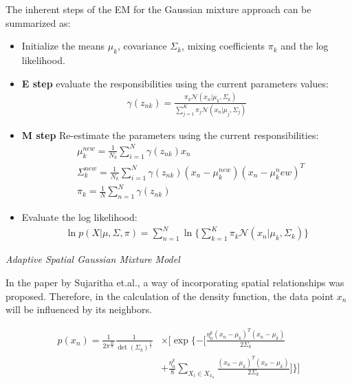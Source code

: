 \documentclass[12pt,letterpaper]{article}
\begin{document}
The inherent steps of the EM for the Gaussian mixture approach can be summarized as:
\begin{itemize}
\item Initialize the means $\mu_k$, covariance $\Sigma_k$, mixing coefficients $\pi_k$ and the log likelihood.
\item \textbf{E step} evaluate the responsibilities using the current parameters values:
\begin{align}
\gamma(z_{nk} )= \frac{\pi_k \mathcal{N}(x_n | \mu_k, \Sigma_k)}{\sum_{j=1}^{K}\pi_j\mathcal{N}(x_n |\mu_j, \Sigma_j)}
\end{align}
\item \textbf{M step} Re-estimate the parameters using the current responsibilities:
\begin{align}
&\mu_k^{new} = \frac{1}{N_k}\sum_{i=1}^N \gamma(z_{nk})x_n \\
&\Sigma_k^{new} =  \frac{1}{N_k}\sum_{i=1}^N \gamma(z_{nk})(x_n - \mu_k^{new})(x_n - \mu_k^new)^T \\
&\pi_k = \frac{1}{N}\sum_{n=1}^{N}\gamma(z_{nk} )
\end{align}
\item Evaluate the log likelihood:
\begin{align}
\ln p(X | \mu,\Sigma,\pi) = \sum_{n=1}^{N}\ln \lbrace\sum_{k=1}^{K}\pi_k \mathcal{N}(x_n|\mu_k, \Sigma_k)\rbrace
\end{align}
\end{itemize}

\textit{Adaptive Spatial Gaussian Mixture Model}

In the paper by Sujaritha et.al., a way of incorporating spatial relationships was proposed. Therefore, in the calculation 
of the density function, the data point $x_n$ will be influenced by its neighbors.
 
 \begin{align}
p(x_n) = \frac{1}{2\pi^{\frac{D}{2}}}\frac{1}{\det(\Sigma_k)^{\frac{1}{2}}} \nonumber
&\times [\exp\lbrace-[\frac{\eta_n^k(x_n - \mu_k)^T(x_n - \mu_k)}{2\Sigma_k} \\
&+ \frac{\eta_n^k}{8} \sum_{X_l \in X_{x_n}} 
 \frac{(x_n - \mu_k)^T(x_n - \mu_k)}{2\Sigma_k} ]\rbrace]
\end{align}
\end{document}
